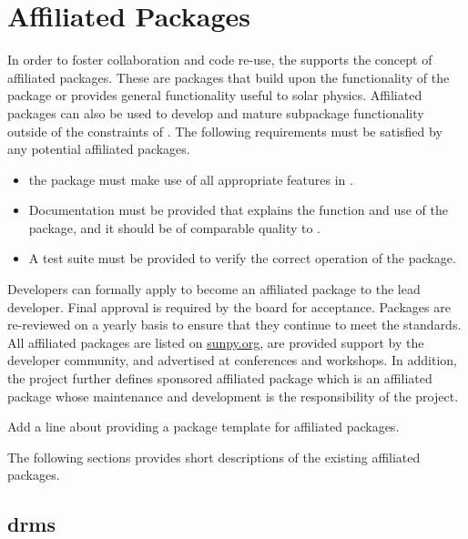 \section{Affiliated Packages}
\label{sec:affil_package}

In order to foster collaboration and code re-use, the \sunpyproj supports the concept of affiliated packages.
These are \python packages that build upon the functionality of the \sunpypkg package or provides general functionality useful to solar physics.
Affiliated packages can also be used to develop and mature subpackage functionality outside of the constraints of \sunpypkg.
The following requirements must be satisfied by any potential affiliated packages.
\begin{itemize}
    \item the package must make use of all appropriate features in \sunpypkg.
    \item Documentation must be provided that explains the function and use of the package, and it should be of comparable quality to \sunpypkg.
    \item A test suite must be provided to verify the correct operation of the package.
\end{itemize}
Developers can formally apply to become an affiliated package to the lead developer.
Final approval is required by the \sunpy board for acceptance.
Packages are re-reviewed on a yearly basis to ensure that they continue to meet the standards.
All affiliated packages are listed on \url{sunpy.org}, are provided support by the \sunpy developer community, and advertised at conferences and workshops.
In addition, the project further defines sponsored affiliated package which is an affiliated package whose maintenance and development is the responsibility of the \sunpy project.

Add a line about providing a package template for affiliated packages.

The following sections provides short descriptions of the existing affiliated packages.
\label{sec:affil_packages}

\subsection{drms}
\label{sec:drms}

